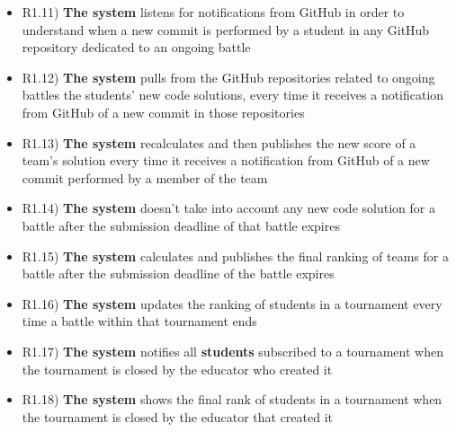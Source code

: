 \begin{itemize}
\begin{itemize}
			\item R1.11) \textbf{The system} listens for notifications from GitHub in order to understand when a new commit is performed by a student in any GitHub repository dedicated to an ongoing battle
			\item R1.12) \textbf{The system} pulls from the GitHub repositories related to ongoing battles the students' new code solutions, every time it receives a notification from GitHub of a new commit in those repositories
			\item R1.13) \textbf{The system} recalculates and then publishes the new score of a team's solution every time it receives a notification from GitHub of a new commit performed by a member of the team
			\item R1.14) \textbf{The system} doesn't take into account any new code solution for a battle after the submission deadline of that battle expires
			\item R1.15) \textbf{The system} calculates and publishes the final ranking of teams for a battle after the submission deadline of the battle expires
			\item R1.16) \textbf{The system} updates the ranking of students in a tournament every time a battle within that tournament ends
			\item R1.17) \textbf{The system} notifies all \textbf{students} subscribed to a tournament when the tournament is closed by the educator who created it
			\item R1.18) \textbf{The system} shows the final rank of students in a tournament when the tournament is closed by the educator that created it
		\end{itemize}
	\end{itemize}
	

	
	

